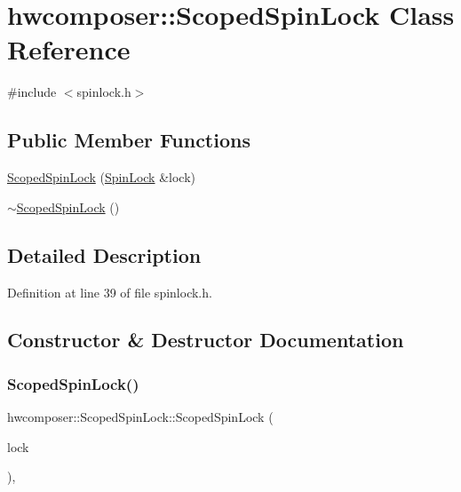 \hypertarget{classhwcomposer_1_1ScopedSpinLock}{}\section{hwcomposer\+:\+:Scoped\+Spin\+Lock Class Reference}
\label{classhwcomposer_1_1ScopedSpinLock}


{\ttfamily \#include $<$spinlock.\+h$>$}

\subsection*{Public Member Functions}
\begin{DoxyCompactItemize}
\item 
\mbox{\hyperlink{classhwcomposer_1_1ScopedSpinLock_a05f45a6691308bb40f47d48ef821f750}{Scoped\+Spin\+Lock}} (\mbox{\hyperlink{classhwcomposer_1_1SpinLock}{Spin\+Lock}} \&lock)
\item 
\mbox{\hyperlink{classhwcomposer_1_1ScopedSpinLock_a289f735cece10df9d5edb4a864dc09f1}{$\sim$\+Scoped\+Spin\+Lock}} ()
\end{DoxyCompactItemize}


\subsection{Detailed Description}


Definition at line 39 of file spinlock.\+h.



\subsection{Constructor \& Destructor Documentation}
\mbox{\label{classhwcomposer_1_1ScopedSpinLock_a05f45a6691308bb40f47d48ef821f750}} 
\subsubsection{\texorpdfstring{Scoped\+Spin\+Lock()}{ScopedSpinLock()}}
{\footnotesize\ttfamily hwcomposer\+::\+Scoped\+Spin\+Lock\+::\+Scoped\+Spin\+Lock (\begin{DoxyParamCaption}\item[{\mbox{\hyperlink{classhwcomposer_1_1SpinLock}{Spin\+Lock}} \&}]{lock }\end{DoxyParamCaption})\hspace{0.3cm}{\ttfamily [inline]}, {\ttfamily [explicit]}}



